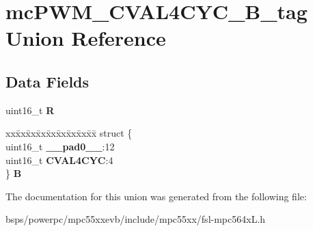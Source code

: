 \hypertarget{unionmcPWM__CVAL4CYC__16B__tag}{}\section{mc\+P\+W\+M\+\_\+\+C\+V\+A\+L4\+C\+Y\+C\+\_\+B\+\_\+tag Union Reference}
\label{unionmcPWM__CVAL4CYC__16B__tag}
\subsection*{Data Fields}
\begin{DoxyCompactItemize}
\item 
\mbox{\label{unionmcPWM__CVAL4CYC__16B__tag_a30a2ab54d8fdd43f191258a5ff282775}} 
uint16\+\_\+t {\bfseries R}
\item 
\mbox{\label{unionmcPWM__CVAL4CYC__16B__tag_a1b2b7ebe5d2cd350067fafe39852a8ff}} 
\begin{tabbing}
xx\=xx\=xx\=xx\=xx\=xx\=xx\=xx\=xx\=\kill
struct \{\\
\>uint16\_t {\bfseries \_\_pad0\_\_}:12\\
\>uint16\_t {\bfseries CVAL4CYC}:4\\
\} {\bfseries B}\\

\end{tabbing}\end{DoxyCompactItemize}


The documentation for this union was generated from the following file\+:\begin{DoxyCompactItemize}
\item 
bsps/powerpc/mpc55xxevb/include/mpc55xx/fsl-\/mpc564x\+L.\+h\end{DoxyCompactItemize}
